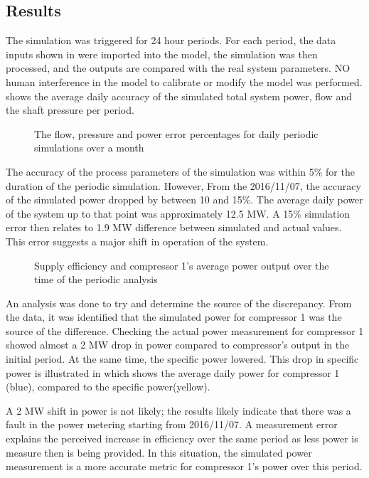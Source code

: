 \subsection{Results}

 The simulation was triggered for 24 hour periods. For each period, the data inputs shown in  were imported into the model, the simulation was then processed, and the outputs are compared with the real system parameters. NO human interference in the model to calibrate or modify the model was performed.  shows the average daily accuracy of the simulated total system power, flow and the shaft pressure per period.
	 \par 
 
	\begin{figure}[h!]
		\centering
		
		\caption{The flow, pressure and power error percentages for daily periodic simulations over a month}
		\label{fig: Periodic simulation}
	\end{figure} 
The accuracy of the process parameters of the simulation was within 5\% for the duration of the periodic simulation. However, From the 2016/11/07, the accuracy of the simulated power dropped by between 10 and 15\%. The average daily power of the system up to that point was approximately 12.5 MW. A 15\% simulation error then relates to 1.9 MW difference between simulated and actual values. This error suggests a major shift in operation of the system.
\par 
\begin{figure}[h!]
	\centering
	
	\caption{Supply efficiency and compressor 1's average power output over the time of the periodic analysis}
	\label{fig: MeasurementAccuracy.}
\end{figure} 

An analysis was done to try and determine the source of the discrepancy. From the data, it was identified that the simulated power for compressor 1 was the source of the difference. Checking the actual power measurement for compressor 1 showed almost a 2 MW drop in power compared to compressor's output in the initial period. At the same time, the specific power lowered. This drop in specific power is illustrated in  which shows the average daily power for compressor 1 (blue), compared to the specific power(yellow). 
\par
	
A 2 MW shift in power is not likely; the results likely indicate that there was a fault in the power metering starting from 2016/11/07. A measurement error explains the perceived increase in efficiency over the same period as less power is measure then is being provided.  In this situation, the simulated power measurement is a more accurate metric for compressor 1’s power over this period.

